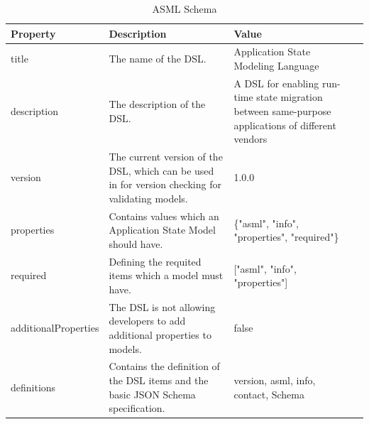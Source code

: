 \FloatBarrier
\begin{table}[H]
\begin{tabularx}{\textwidth}{|l|X|X|r|}
\hline
Property             & Description                                                                              & Value                                                                                                                   \\\hline
title                & The name of the DSL.                                                                     & Application State Modeling Language                                                                                     \\\hline
description          & The description of the DSL.                                                              & A DSL for enabling run-time state migration between same-purpose applications of different vendors \\\hline
version              & The current version of the DSL, which can be used in for version checking for validating models. & 1.0.0                                                                                                                   \\\hline
properties           & Contains values which an Application State Model should have.                                       & \{"asml", "info", "properties", "required"\}                                                                            \\\hline
required             & Defining the requited items which a model must have.                                     & {[}"asml", "info", "properties"{]}                                                                                      \\\hline
additionalProperties & The DSL is not allowing developers to add additional properties to models.               & false                                                                                                                   \\\hline
definitions          & Contains the definition of the DSL items and the basic JSON Schema specification.        & version, asml, info, contact, Schema

\\\hline
\end{tabularx}
\caption{ASML Schema}
\label{tab:asml-schema}
\end{table}
\FloatBarrier





